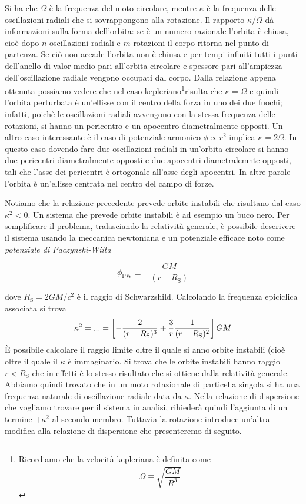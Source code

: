 Si ha che $\Omega$ è la frequenza del moto circolare, mentre $\kappa$ è la frequenza delle oscillazioni radiali che si sovrappongono alla rotazione. Il rapporto $\kappa/\Omega$ dà informazioni sulla forma dell'orbita: se è un numero razionale l'orbita è chiusa, cioè dopo $n$ oscillazioni radiali e $m$ rotazioni il corpo ritorna nel punto di partenza. Se ciò non accade l'orbita non è chiusa e per tempi infiniti tutti i punti dell'anello di valor medio pari all'orbita circolare e spessore pari all'ampiezza dell'oscillazione radiale vengono occupati dal corpo. Dalla relazione appena ottenuta possiamo vedere che nel caso kepleriano\footnote{Ricordiamo che la velocità kepleriana è definita come \begin{align*}
\Omega\equiv \sqrt{\dfrac{GM}{R^3}} 
\end{align*} }risulta che $\kappa = \Omega$ e quindi l'orbita perturbata è un'ellisse con il centro della forza in uno dei due fuochi; infatti, poichè le oscillazioni radiali avvengono con la stessa frequenza delle rotazioni, si hanno un pericentro e un apocentro diametralmente opposti. Un altro caso interessante è il caso di potenziale armonico $\phi \propto r^2$ implica $\kappa = 2 \Omega$. In questo caso dovendo fare due oscillazioni radiali in un'orbita circolare si hanno due pericentri diametralmente opposti e due apocentri diametralemnte opposti, tali che l'asse dei pericentri è ortogonale all'asse degli apocentri. In altre parole l'orbita è un'ellisse centrata nel centro del campo di forze.

Notiamo che la relazione precedente prevede orbite instabili che risultano dal caso $\kappa^2<0$. Un sistema che prevede orbite instabili è ad esempio un buco nero. Per semplificare il problema, tralasciando la relatività generale, è possibile descrivere il sistema usando la meccanica newtoniana e un potenziale efficace noto come \textit{potenziale di Paczynski-Wiita} 
\begin{EQ}
\begin{equation}
\phi_\mathrm{PW} \equiv - \dfrac{GM}{(r-R_\mathrm{S})}
\end{equation}
\end{EQ}
dove $R_\mathrm{S} = 2GM/c^2$ è il raggio di Schwarzshild. Calcolando la frequenza epiciclica associata si trova
\begin{equation}
\kappa^2 = ... = \left[-\dfrac{2}{(r-R_\mathrm{S})^3}+\dfrac{3}{r} \dfrac{1}{(r-R_\mathrm{S})^2} \right] GM
\end{equation}
È possibile calcolare il raggio limite oltre il quale si anno orbite instabili (cioè oltre il quale il $\kappa$ è immaginario. Si trova che le orbite instabili hanno raggio $r<R_\mathrm{S}$ che in effetti è lo stesso risultato che si ottiene dalla relatività generale.
Abbiamo quindi trovato che in un moto rotazionale di particella singola si ha una frequenza naturale di oscillazione radiale data da $\kappa$. Nella relazione di dispersione che vogliamo trovare per il sistema in analisi, rihiederà quindi l'aggiunta di un termine $+\kappa^2$ al secondo membro. Tuttavia la rotazione introduce un'altra modifica alla relazione di dispersione che presenteremo di seguito.

